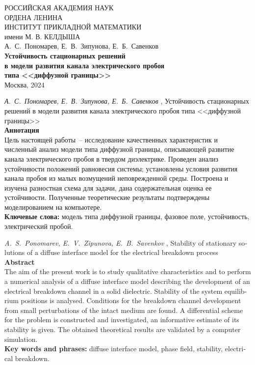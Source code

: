 \documentclass[a4paper,12pt]{article}
\theoremstyle{plain}
\theoremstyle{remark}
\newcommand{\PreprintTitle}{
	Устойчивость стационарных решений в модели развития канала электрического пробоя типа <<диффузной границы>>
}
\newcommand{\PreprintTitleFormatted}{
	Устойчивость стационарных решений \\ в модели развития канала электрического пробоя \\ типа <<диффузной границы>>
}
\newcommand{\PreprintTitleEnglish}{
	Stability of stationary solutions of a diffuse interface model for the electrical breakdown process
}
\newcommand{\PreprintAuthors}{
	А.~С.~Пономарев, Е.~В.~Зипунова, Е.~Б.~Савенков
}
\newcommand{\PreprintAuthorsEnglish}{
	A.~S.~Ponomarev, E.~V.~Zipunova, E.~B.~Savenkov
}
\begin{document}
\begin{titlepage}

\begin{center}
	РОССИЙСКАЯ АКАДЕМИЯ НАУК \\
	ОРДЕНА ЛЕНИНА \\
	ИНСТИТУТ ПРИКЛАДНОЙ МАТЕМАТИКИ \\
	имени М. В. КЕЛДЫША \\

	\vspace*{60mm}
	{
		\Large{\PreprintAuthors} \\
	}
	\vspace*{20mm}
	{
		\large \textbf{\PreprintTitleFormatted} \\
	}
	\vspace*{110mm}
	\Large{Москва, 2024}
	\vspace*{-50mm}
\end{center}

\end{titlepage}

\setcounter{page}{2}

\thispagestyle{empty}

\noindent \emph{\PreprintAuthors}, \PreprintTitle \\[3mm]
\textbf{Аннотация} \\
{
	\small
	Цель настоящей работы~-- исследование качественных характеристик и численный анализ модели типа диффузной границы, описывающей развитие канала электрического пробоя в твердом диэлектрике. Проведен анализ устойчивости положений равновесия системы; установлены условия развития канала пробоя из малых возмущений неповрежденной среды. Построена и изучена разностная схема для задачи, дана содержательная оценка ее устойчивости. Полученные теоретические результаты подтверждены моделированием на компьютере. \\[3mm]
	\textbf{Ключевые слова:} модель типа диффузной границы, фазовое поле, устойчивость, электрический пробой. \\[5mm]
}
\begin{otherlanguage}{english}
\emph{\PreprintAuthorsEnglish}, \PreprintTitleEnglish \\[3mm]
\textbf{Abstract} \\
{
	\small
	The aim of the present work is to study qualitative characteristics and to perform a numerical analysis of a diffuse interface model describing the development of an electrical breakdown channel in a solid dielectric. Stability of the system equilibrium positions is analysed. Conditions for the breakdown channel development from small perturbations of the intact medium are found. A differential scheme for the problem is constructed and investigated, an informative estimate of its stability is given. The obtained theoretical results are validated by a computer simulation. \\[3mm]
	\textbf{Key words and phrases:} diffuse interface model, phase field, stability, electrical breakdown. \\[5mm]
}
\end{otherlanguage}
\end{document}
